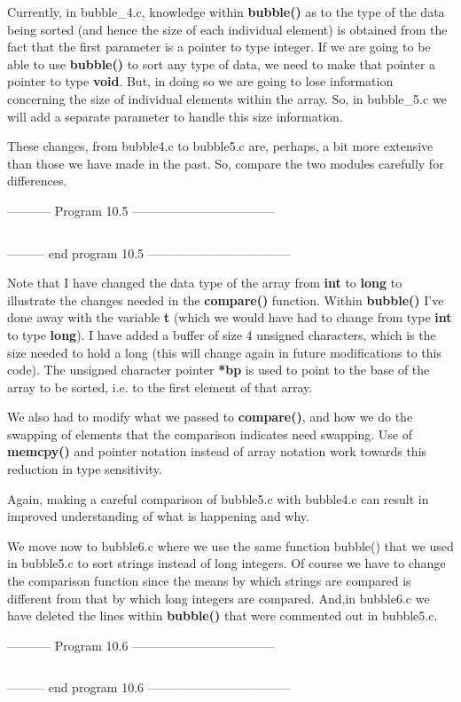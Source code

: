 Currently, in bubble\_4.c, knowledge within \textbf{bubble()} as to the
type of the data being sorted (and hence the size of each individual
element) is obtained from the fact that the first parameter is a pointer
to type integer. If we are going to be able to use \textbf{bubble()} to
sort any type of data, we need to make that pointer a pointer to type
\textbf{void}. But, in doing so we are going to lose information
concerning the size of individual elements within the array. So, in
bubble\_5.c we will add a separate parameter to handle this size
information.

These changes, from bubble4.c to bubble5.c are, perhaps, a bit more
extensive than those we have made in the past. So, compare the two
modules carefully for differences.

-----------  Program 10.5  -----------------------------------
\inputminted{c}{../src/ch10-5.c}
--------- end program 10.5 -----------------------------------

Note that I have changed the data type of the array from \textbf{int} to
\textbf{long} to illustrate the changes needed in the \textbf{compare()}
function. Within \textbf{bubble()} I've done away with the variable
\textbf{t} (which we would have had to change from type \textbf{int} to
type \textbf{long}). I have added a buffer of size 4 unsigned
characters, which is the size needed to hold a long (this will change
again in future modifications to this code). The unsigned character
pointer \textbf{*bp} is used to point to the base of the array to be
sorted, i.e. to the first element of that array.

We also had to modify what we passed to \textbf{compare()}, and how we
do the swapping of elements that the comparison indicates need swapping.
Use of \textbf{memcpy()} and pointer notation instead of array notation
work towards this reduction in type sensitivity.

Again, making a careful comparison of bubble5.c with bubble4.c can
result in improved understanding of what is happening and why.

We move now to bubble6.c where we use the same function bubble() that we
used in bubble5.c to sort strings instead of long integers. Of course we
have to change the comparison function since the means by which strings
are compared is different from that by which long integers are compared.
And,in bubble6.c we have deleted the lines within \textbf{bubble()} that
were commented out in bubble5.c.

-----------  Program 10.6  -----------------------------------
\inputminted{c}{../src/ch10-6.c}
--------- end program 10.6 -----------------------------------

